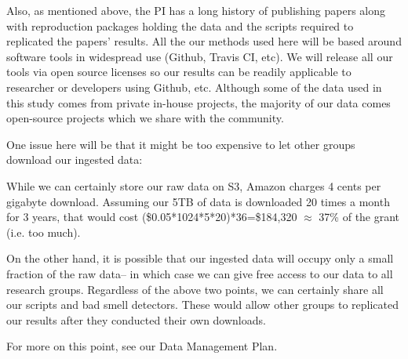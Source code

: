 Also, as mentioned above, the PI has a long history of publishing papers along with reproduction packages holding the data and the scripts required to
replicated the papers' results. All the our methods used here will be based around software tools in widespread   use (Github, Travis CI, etc).  We will release all our tools via open source licenses so our results can be readily applicable to researcher or developers using   Github, etc.
Although some of the data used in this study comes from private in-house projects,
the majority of our data comes open-source projects which we share with the community.

One issue here will be that it might be  too expensive
to let other groups download our  ingested data:
\bi
\item While we can certainly store our raw data on  S3,  Amazon   charges 4 cents per gigabyte download. Assuming our 5TB of data is downloaded 20 times a month for 3 years, that would cost \newline (\$0.05*1024*5*20)*36=\$184,320 $\approx$ 37\% of the grant (i.e. too much).
\item On the other hand, it is possible that our ingested data will occupy only a small fraction of the raw data-- in which case we can give free access
to our data to all
research groups.
\ei
Regardless of the above two points, we can certainly share all our scripts and bad smell detectors. These would allow other groups to replicated our results
after they conducted their own downloads.
 
For more on this point, see our Data Management Plan.

 


